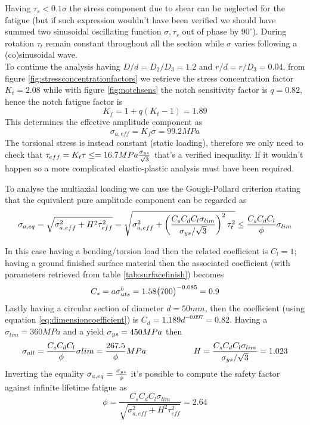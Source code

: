 	Having $\tau_s < 0.1 \sigma$ the stress component due to shear can be neglected for the fatigue (but if such expression wouldn't have been verified we should have summed two sinusoidal oscillating function $\sigma,\tau_s$ out of phase by $90^\circ$). During rotation $\tau_t$ remain constant throughout all the section while $\sigma$ varies following a (co)sinusoidal wave.\\
	To continue the analysis having $D/d = D_2 /D_3 = 1.2$ and $r/d = r/D_3 = 0.04$, from figure \ref{fig:stressconcentrationfactors} we retrieve the stress concentration factor $K_t = 2.08$ while with figure \ref{fig:notchsens} the notch sensitivity factor is $q = 0.82$, hence the notch fatigue factor is
	\[ K_f = 1 + q(K_t-1) = 1.89 \]
	This determines the effective amplitude component as
	\[ \sigma_{a,eff} = K_f \sigma = 99.2MPa \]
	The torsional stress is instead constant (static loading), therefore we only need to check that $\tau_{eff} = K_t \tau \leq = 16.7MPa \frac{\sigma_{ys}}{\sqrt 3}$ that's a verified inequality. If it wouldn't happen so a more complicated elastic-plastic analysis must have been required.
	
	To analyse the multiaxial loading we can use the Gough-Pollard criterion stating that the equivalent pure amplitude component can be regarded as
	\[ \sigma_{a,eq} = \sqrt{ \sigma_{a,eff}^2 + H^2 \tau_{eff}^2 } = \sqrt{\sigma_{a,eff}^2 + \left( \frac{C_s C_d C_l \sigma_{lim}}{\sigma_{ys}/\sqrt 3} \right)^2 \tau_t^2  } \leq \frac{C_sC_dC_l}{\phi} \sigma_{lim} \]
	
	In this case having a bending/torsion load then the related coefficient is $C_l = 1$; having a ground finished surface material then the associated coefficient (with parameters retrieved from table \ref{tab:surfacefinish}) becomes
	\[ C_s = a \sigma_{uts}^b = 1.58 \big(700\big)^{-0.085} = 0.9 \]
	Lastly having a circular section of diameter $d=50mm$, then the coefficient (using equation \ref{eq:dimensioncoefficient}) is $C_d = 1.189 d^{-0.097} = 0.82$. Having a $\sigma_{lim} = 360MPa$ and a yield $\sigma_{ys} = 450MPa$ then
	\[ \sigma_{all} = \frac{C_sC_dC_l}{\phi} \sigma{lim} = \frac{267.5}{\phi} MPa \hspace{2cm} H = \frac{C_sC_dC_l \sigma_{lim}}{\sigma_{ys}/\sqrt 3} = 1.023 \]
	Inverting the equality $\sigma_{a,eq} = \frac {\sigma_{ys}} \phi$ it's possible to compute the safety factor against infinite lifetime fatigue as
	\[ \phi = \frac {C_sC_dC_l\sigma_{lim}}{\sqrt{ \sigma_{a,eff}^2 + H^2 \tau_{eff}^2 }} = 2.64\]
	
	
	
	
	
	
	
	
	
	
	
	